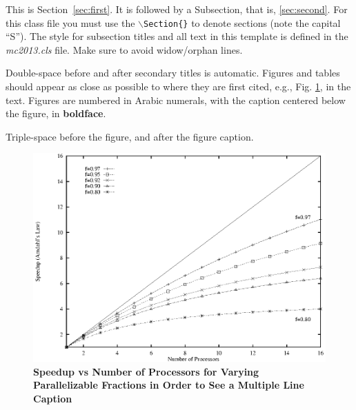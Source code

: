 \documentclass{mc2013}
\begin{document}

    
\clearpage

\appendix

\label{sec:first}

This is Section~\ref{sec:first}. It is followed by a Subsection, that is, 
\ref{sec:second}. For this class file you must use the 
\texttt{$\backslash$Section\{\}} to denote sections (note the capital ``S'').  
The style for subsection titles and all text in this template is defined in 
the {\it mc2013.cls} file.  Make sure to avoid widow/orphan lines.


\label{sec:second}

Double-space before and after secondary titles is automatic.  Figures and 
tables should appear as close as possible to where they are first
cited, e.g., Fig. \ref{fig:amdahl}, in the text.  Figures are numbered in 
Arabic numerals, with the caption centered below the figure, in 
{\bf boldface}.
  
Triple-space before the figure, and after the figure caption.

%
\vspace{16pt}
\begin{figure}[!htb]
\begin{spacing}{1.0}
\centering
\includegraphics[scale=0.60]{./figure.eps}
\caption{\bf Speedup vs Number of Processors for Varying Parallelizable 
Fractions in Order to See a Multiple Line Caption} 
\label{fig:amdahl}
\end{spacing}
\end{figure}
\vspace{16pt}
%
\end{document}
